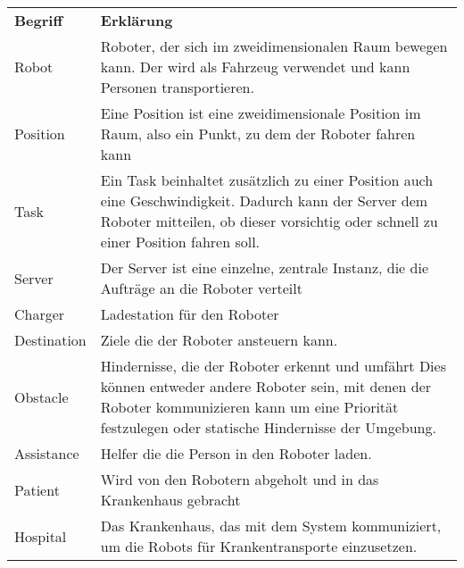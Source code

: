 	\begin{tabularx}{\textwidth}{lX}
		\textbf{Begriff} & \textbf{Erklärung}\\
		Robot & Roboter, der sich im zweidimensionalen Raum bewegen kann. Der wird
		als Fahrzeug verwendet und kann Personen transportieren.\\
		Position & Eine Position ist eine zweidimensionale Position im Raum,
		also ein Punkt, zu dem der Roboter fahren kann\\
		Task & Ein Task beinhaltet zusätzlich zu einer Position auch eine
		Geschwindigkeit. Dadurch kann der Server dem Roboter mitteilen, ob
		dieser vorsichtig oder schnell zu einer Position fahren
		soll.\\
		Server & Der Server ist eine einzelne, zentrale Instanz, die die Aufträge
		an die Roboter verteilt\\
		Charger & Ladestation für den Roboter\\
		Destination & Ziele die der Roboter ansteuern kann.\\
		Obstacle & Hindernisse, die der Roboter erkennt und umfährt Dies können
		entweder andere Roboter sein, mit denen der Roboter kommunizieren kann
		um eine Priorität festzulegen oder statische Hindernisse der
		Umgebung.\\
		Assistance & Helfer die die Person in den Roboter laden.\\
		Patient & Wird von den Robotern abgeholt und in das Krankenhaus gebracht\\
		Hospital & Das Krankenhaus, das mit dem System kommuniziert, um die Robots für Krankentransporte einzusetzen.
	\end{tabularx}
